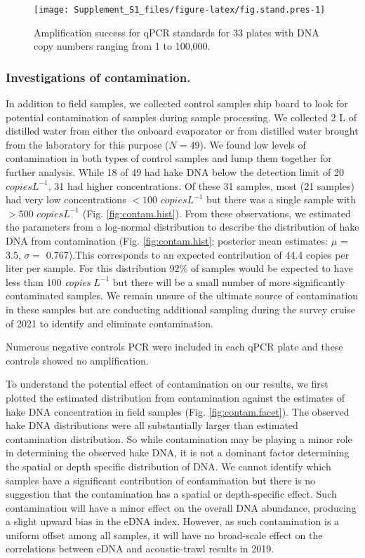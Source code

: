 \documentclass[
]{article}
\begin{document}
\begin{figure}
\texttt{[image: Supplement\_S1\_files/figure-latex/fig.stand.pres-1]} \caption{\label{fig:stand.pres} Amplification success for qPCR standards for 33 plates with DNA copy numbers ranging from 1 to 100,000.}\label{fig:fig.stand.pres}
\end{figure}

\hypertarget{investigations-of-contamination.}{%
\subsubsection{Investigations of
contamination.}\label{investigations-of-contamination.}}

In addition to field samples, we collected control samples ship board to
look for potential contamination of samples during sample processing. We
collected 2 L of distilled water from either the onboard evaporator or
from distilled water brought from the laboratory for this purpose
(\(N=49\)). We found low levels of contamination in both types of
control samples and lump them together for further analysis. While 18 of
49 had hake DNA below the detection limit of 20 \(copies L^{-1}\), 31
had higher concentrations. Of these 31 samples, most (21 samples) had
very low concentrations \(<100\) \(copies L^{-1}\) but there was a
single sample with \(>500\) \(copies L^{-1}\) (Fig.
\ref{fig:contam.hist}). From these observations, we estimated the
parameters from a log-normal distribution to describe the distribution
of hake DNA from contamination (Fig. \ref{fig:contam.hist}; posterior
mean estimates: \(\mu\) = 3.5, \(\sigma =\) 0.767).This corresponds to
an expected contribution of 44.4 copies per liter per sample. For this
distribution 92\% of samples would be expected to have less than 100
\emph{copies} \(L^{-1}\) but there will be a small number of more
significantly contaminated samples. We remain unsure of the ultimate
source of contamination in these samples but are conducting additional
sampling during the survey cruise of 2021 to identify and eliminate
contamination.

Numerous negative controls PCR were included in each qPCR plate and
these controls showed no amplification.

To understand the potential effect of contamination on our results, we
first plotted the estimated distribution from contamination against the
estimates of hake DNA concentration in field samples (Fig.
\ref{fig:contam.facet}). The observed hake DNA distributions were all
substantially larger than estimated contamination distribution. So while
contamination may be playing a minor role in determining the observed
hake DNA, it is not a dominant factor determining the spatial or depth
specific distribution of DNA. We cannot identify which samples have a
significant contribution of contamination but there is no suggestion
that the contamination has a spatial or depth-specific effect. Such
contamination will have a minor effect on the overall DNA abundance,
producing a slight upward bias in the eDNA index. However, as such
contamination is a uniform offset among all samples, it will have no
broad-scale effect on the correlations between eDNA and acoustic-trawl
results in 2019.
\end{document}
